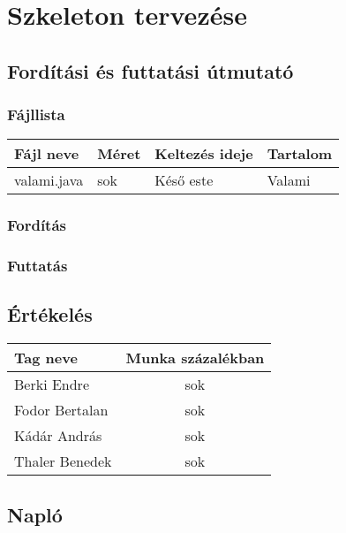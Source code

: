 



\fedlap

\addtocounter{section}{5}
\section{Szkeleton tervezése}

	\subsection{Fordítási és futtatási útmutató}
	
		\subsubsection{Fájllista}
			\begin{center}
			    \begin{tabular}{ | l | l | l | p{5cm} |}
				    \hline
				    \textbf{Fájl neve}	& \textbf{Méret}	& \textbf{Keltezés ideje}	& \textbf{Tartalom} \\ \hline
				    valami.java			& sok				& Késő este					& Valami			\\ \hline
			    \end{tabular}
			\end{center}
			
		\subsubsection{Fordítás}
		
		\subsubsection{Futtatás}
		
	\subsection{Értékelés}
		\begin{center}
		    \begin{tabular}{ | l | c |}
			    \hline
			    \textbf{Tag neve}	& \textbf{Munka százalékban} 	\\ \hline
				Berki Endre			& sok							\\ \hline			    
			    Fodor Bertalan		& sok							\\ \hline
			    Kádár András		& sok							\\ \hline
			    Thaler Benedek		& sok							\\ \hline
		    \end{tabular}
		\end{center}
	\subsection{Napló}

